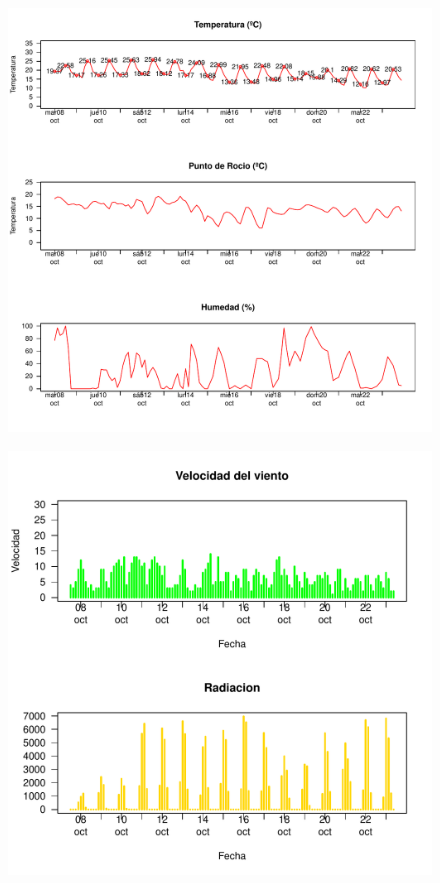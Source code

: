 \documentclass{article}\usepackage[]{graphicx}\usepackage[]{color}
\makeatletter
\def\maxwidth{ %
  \ifdim\Gin@nat@width>\linewidth
    \linewidth
  \else
    \Gin@nat@width
  \fi
}
\newenvironment{knitrout}{}{} %
\makeatother
\begin{document}
\begin{figure}[h!]
\begin{knitrout}
\color{fgcolor}
\includegraphics[width=\maxwidth]{figure/Figtemp-1} 

\end{knitrout}
\end{figure}

\begin{figure}[h!]
\begin{knitrout}
\color{fgcolor}
\includegraphics[width=\maxwidth]{figure/Figwind-1} 

\end{knitrout}
\end{figure}
\end{document}

